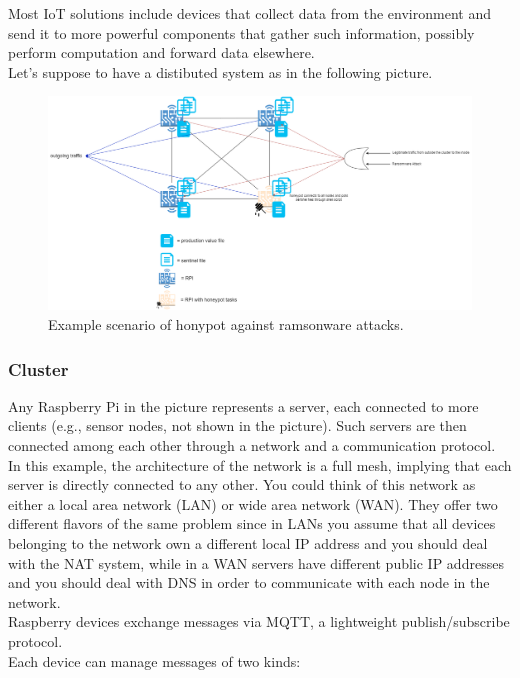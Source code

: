 Most IoT solutions include devices that collect data from the environment and send it to more powerful components that gather such information, possibly perform computation and forward data elsewhere.\\
Let's suppose to have a distibuted system as in the following picture.


\begin{figure}[h!]
  \centering
  \includegraphics[width = 16cm]{images/ramsonwareHoneypot.png}
  \caption{ Example scenario of honypot against ramsonware attacks.}
  \label{fig:irradiances}
\end{figure}
\FloatBarrier

\subsubsection{Cluster}

\noindent Any Raspberry Pi in the picture represents a server, each connected to more clients (e.g., sensor nodes, not shown in the picture). Such servers are then connected among each other through a network and a communication protocol.\\
In this example, the architecture of the network is a full mesh, implying that each server is directly connected to any other. You could think of this network as either a local area network (LAN) or wide area network (WAN). They offer two different flavors of the same problem since in LANs you assume that all devices belonging to the network own a different local IP address and you should deal with the NAT system, while in a WAN servers have different public IP addresses and you should deal with DNS in order to communicate with each node in the network. \\ 
Raspberry devices exchange messages via MQTT, a lightweight publish/subscribe protocol. \\
Each device can manage messages of two kinds:

